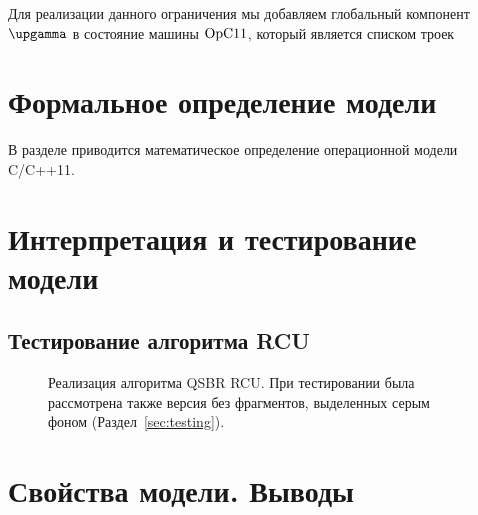 Для реализации данного ограничения мы добавляем глобальный компонент $\stGamma$ в состояние машины $\mathrm{OpC11}$,
который является списком троек 

\section{Формальное определение модели}
\label{sec:opc11:formal}
В разделе приводится математическое определение операционной модели C/C++11.

\section{Интерпретация и тестирование модели}

\subsection{Тестирование алгоритма RCU}



\begin{figure*}[t]

\caption[Реализация алгоритма QSBR RCU]
{Реализация алгоритма QSBR RCU.
 При тестировании была рассмотрена также версия без фрагментов, выделенных серым фоном
 (Раздел~\ref{sec:testing}).}
\label{fig:rcuProg}
\end{figure*}

\section{Свойства модели. Выводы}
